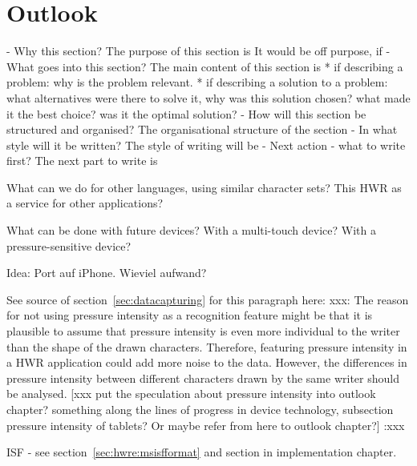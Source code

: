 
\chapter{Outlook}

- Why this section? 
  The purpose of this section is 
  It would be off purpose, if 
- What goes into this section?
  The main content of this section is 
  * if describing a problem: why is the problem relevant.
  * if describing a solution to a problem: what alternatives were
    there to solve it, why was this solution chosen? 
    what made it the best choice? was it the optimal solution?
- How will this section be structured and organised?
  The organisational structure of the section 
- In what style will it be written?
  The style of writing will be 
- Next action - what to write first?
  The next part to write is

What can we do for other languages, using similar character sets?
This HWR as a service for other applications?

What can be done with future devices?
With a multi-touch device?
With a pressure-sensitive device?

Idea: Port auf iPhone. Wieviel aufwand?

See source of section~\ref{sec:datacapturing} for this paragraph here:
xxx: 
The reason for not using pressure intensity as a recognition feature might be 
that it is plausible to assume that pressure intensity is even more individual 
to the writer than the shape of the drawn characters. 
Therefore, featuring pressure intensity in a HWR application could add more 
noise to the data. However, the differences in pressure intensity 
between different characters drawn by the same writer should be analysed.
[xxx put the speculation about pressure intensity into outlook chapter? 
something along the lines of progress in device technology, 
subsection pressure intensity of tablets? Or maybe refer from here to
outlook chapter?] 
:xxx


ISF - see section~\ref{sec:hwre:msisfformat} and section in 
implementation chapter.
